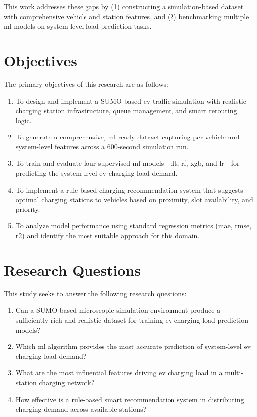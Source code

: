 \documentclass{thesis-library}
\begin{document}
This work addresses these gaps by (1) constructing a simulation-based dataset with
comprehensive vehicle and station features, and (2) benchmarking multiple \Gls{ml}
models on system-level load prediction tasks.

\section{Objectives}

The primary objectives of this research are as follows:

\begin{enumerate}
  \item To design and implement a SUMO-based \Gls{ev} traffic simulation with realistic
        charging station infrastructure, queue management, and smart rerouting logic.
  \item To generate a comprehensive, \Gls{ml}-ready dataset capturing per-vehicle and
        system-level features across a 600-second simulation run.
  \item To train and evaluate four supervised \Gls{ml} models---\Gls{dt}, \Gls{rf},
        \Gls{xgb}, and \Gls{lr}---for predicting the system-level \Gls{ev} charging
        load demand.
  \item To implement a rule-based charging recommendation system that suggests optimal
        charging stations to vehicles based on proximity, slot availability, and priority.
  \item To analyze model performance using standard regression metrics (\Gls{mae},
        \Gls{rmse}, \Gls{r2}) and identify the most suitable approach for this domain.
\end{enumerate}

\section{Research Questions}

This study seeks to answer the following research questions:

\begin{enumerate}
  \item Can a SUMO-based microscopic simulation environment produce a sufficiently rich
        and realistic dataset for training \Gls{ev} charging load prediction models?
  \item Which \Gls{ml} algorithm provides the most accurate prediction of system-level
        \Gls{ev} charging load demand?
  \item What are the most influential features driving \Gls{ev} charging load in a
        multi-station charging network?
  \item How effective is a rule-based smart recommendation system in distributing
        charging demand across available stations?
\end{enumerate}
\end{document}
